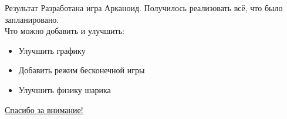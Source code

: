 \documentclass[10pt]{beamer}
\begin{document}
\begin{frame}[fragile]{Результат}
    Разработана игра Арканоид. Получилось реализовать всё, что было запланировано.\\
    Что можно добавить и улучшить:
    \begin{itemize}
        \item Улучшить графику
        \item Добавить режим бесконечной игры
        \item Улучшить физику шарика
    \end{itemize}
\end{frame}

\begin{frame}
    \begin{center}
        \Large
        \underline{Спасибо за внимание!}
    \end{center}
\end{frame}
\end{document}
